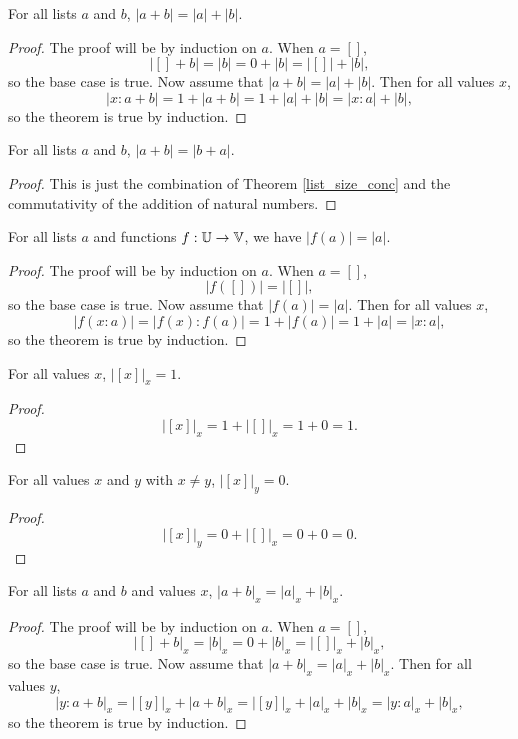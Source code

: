 \documentclass[../../math.tex]{subfiles}
\begin{document}
\begin{theorem} \label{list_size_conc}
    For all lists $a$ and $b$, $|a + b| = |a| + |b|$.
\end{theorem}
\begin{proof}
    The proof will be by induction on $a$.  When $a = []$,
    \[
        |[] + b| = |b| = 0 + |b| = |[]| + |b|,
    \]
    so the base case is true.  Now assume that $|a + b| = |a| + |b|$.  Then for
    all values $x$,
    \[
        |x : a + b| = 1 + |a + b| = 1 + |a| + |b| = |x : a| + |b|,
    \]
    so the theorem is true by induction.
\end{proof}

\begin{theorem} \label{list_size_comm}
    For all lists $a$ and $b$, $|a + b| = |b + a|$.
\end{theorem}
\begin{proof}
    This is just the combination of Theorem \ref{list_size_conc} and the
    commutativity of the addition of natural numbers.
\end{proof}

\begin{theorem} \label{list_image_size}
    For all lists $a$ and functions $f : \mathbb{U} \to \mathbb{V}$, we have $|f(a)| = |a|$.
\end{theorem}
\begin{proof}
    The proof will be by induction on $a$.  When $a = []$,
    \[
        |f([])| = |[]|,
    \]
    so the base case is true.  Now assume that $|f(a)| = |a|$.  Then for all
    values $x$,
    \[
        |f(x : a)| = |f(x) : f(a)| = 1 + |f(a)| = 1 + |a| = |x : a|,
    \]
    so the theorem is true by induction.
\end{proof}

\begin{theorem}
    For all values $x$, $|[x]|_x = 1$.
\end{theorem}
\begin{proof}
    \[
        |[x]|_x = 1 + |[]|_x = 1 + 0 = 1.
    \]
\end{proof}

\begin{theorem}
    For all values $x$ and $y$ with $x \neq y$, $|[x]|_y = 0$.
\end{theorem}
\begin{proof}
    \[
        |[x]|_y = 0 + |[]|_x = 0 + 0 = 0.
    \]
\end{proof}

\begin{theorem} \label{list_count_conc}
    For all lists $a$ and $b$ and values $x$, $|a + b|_x = |a|_x + |b|_x$.
\end{theorem}
\begin{proof}
    The proof will be by induction on $a$.  When $a = []$,
    \[
        |[] + b|_x = |b|_x = 0 + |b|_x = |[]|_x + |b|_x,
    \]
    so the base case is true.  Now assume that $|a + b|_x = |a|_x + |b|_x$.
    Then for all values $y$,
    \[
        |y : a + b|_x = |[y]|_x + |a + b|_x = |[y]|_x + |a|_x + |b|_x
        = |y : a|_x + |b|_x,
    \]
    so the theorem is true by induction.
\end{proof}
\end{document}
